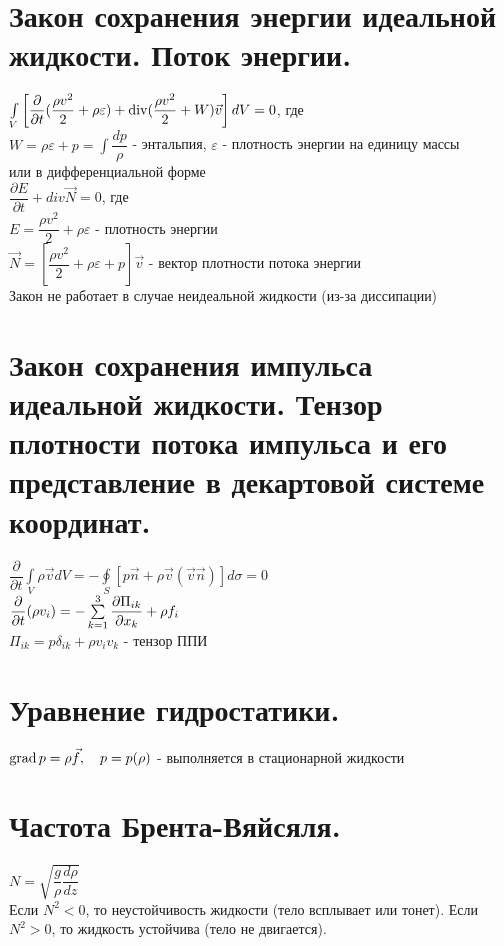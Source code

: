\begin{multicols*}{2}
		\section{Закон сохранения энергии идеальной жидкости. Поток энергии.}
		$\int\limits_V\left[\dfrac{\partial}{\partial t}(\dfrac{\rho v^2}{2}+\rho\varepsilon)+\operatorname{div}(\dfrac{\rho v^2}{2}+W)\vec{v}\right]dV=0$, где\\
		$W=\rho\varepsilon+p = \int\dfrac{dp}{\rho} $ - энтальпия, $\varepsilon$ - плотность энергии на единицу массы \\
		или в дифференциальной форме \\
		$\dfrac{\partial E}{\partial t}+div\vec{N}=0$, где \\
		$E=\dfrac{\rho v^2}{2}+\rho\varepsilon$ - плотность энергии \\
		$\vec{N}=\left[\dfrac{\rho v^2}{2}+\rho\varepsilon+p\right]\vec{v}$ - вектор плотности потока энергии\\
		Закон не работает в случае неидеальной жидкости (из-за диссипации)
		
		\section{Закон сохранения импульса идеальной жидкости. Тензор плотности потока импульса и его представление в декартовой системе координат.}
		$ \dfrac{\partial}{\partial t}\int\limits_V \rho\vec{v}dV=-\oint\limits_S \left[p\vec{n}+\rho\vec{v}(\vec{v}\vec{n})\right]d\sigma = 0$ \\
		$ \dfrac{\partial}{\partial t}(\rho v_i)=-\sum\limits_{k=1}^3\dfrac{\partial \Pi_{ik}}{\partial x_k} + \rho f_i $ \\
		$ \Pi_{ik} = p\delta_{ik}+\rho v_iv_k$ - тензор ППИ
		
		\section{Уравнение гидростатики.}
		$\operatorname{grad} p=\rho\vec{f}, \quad p=p(\rho)$ - выполняется в стационарной жидкости
		
		\section{Частота Брента-Вяйсяля.}
		$N=\sqrt{\dfrac{g}{\rho}\dfrac{d\rho}{dz}}$\\
		Если $N^2<0$, то неустойчивость жидкости (тело всплывает или тонет). Если $N^2>0$, то жидкость устойчива (тело не двигается).
		

\end{multicols*}

